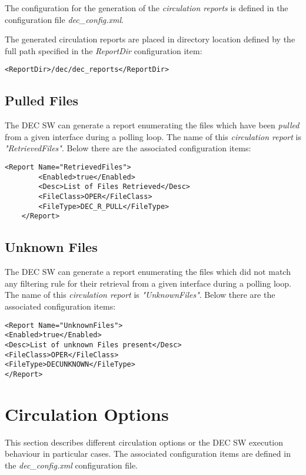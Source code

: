\documentclass[dec_sum_main.tex]{subfiles}
\begin{document}
\par
\noindent
The configuration for the generation of the \textit{circulation reports} is defined in the configuration file \textit{dec\_config.xml}.

\par
\noindent
The generated circulation reports are placed in directory location defined by the full path specified in the \textit{ReportDir} configuration item: \begin{verbatim}<ReportDir>/dec/dec_reports</ReportDir>\end{verbatim} 

\subsection{Pulled Files}
The DEC SW can generate a report enumerating the files which have been \textit{pulled} from a given interface during a polling loop. The name of this \textit{circulation report} is \textit{"RetrievedFiles"}. Below there are the associated configuration items: 

\par
\noindent

\begin{verbatim}
<Report Name="RetrievedFiles">
		<Enabled>true</Enabled>
		<Desc>List of Files Retrieved</Desc>
		<FileClass>OPER</FileClass>
		<FileType>DEC_R_PULL</FileType>
	</Report>
\end{verbatim}

\subsection{Unknown Files}
The DEC SW can generate a report enumerating the files which did not match any filtering rule for their retrieval from a given interface during a polling loop. The name of this \textit{circulation report} is \textit{"UnknownFiles"}. Below there are the associated configuration items: 

\par
\noindent

\begin{verbatim}
<Report Name="UnknownFiles">
<Enabled>true</Enabled>
<Desc>List of unknown Files present</Desc>
<FileClass>OPER</FileClass>
<FileType>DECUNKNOWN</FileType>
</Report>
\end{verbatim}


\section{Circulation Options}
This section describes different circulation options or the DEC SW execution behaviour in particular cases. The associated configuration items are defined in the \textit{dec\_config.xml} configuration file.
\end{document}
